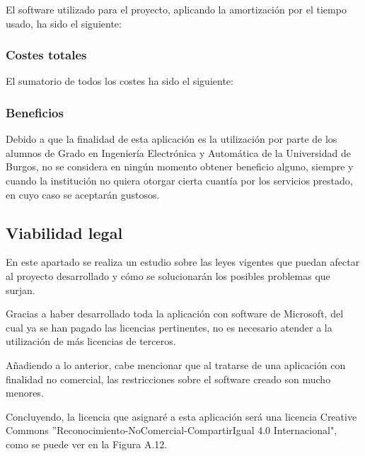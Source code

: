 El software utilizado para el proyecto, aplicando la amortización por el tiempo usado, ha sido el siguiente:


\subsubsection{Costes totales}

El sumatorio de todos los costes ha sido el siguiente:


\subsubsection{Beneficios}

Debido a que la finalidad de esta aplicación es la utilización por parte de los alumnos de Grado en Ingeniería Electrónica y Automática de la Universidad de Burgos, no se considera en ningún momento obtener beneficio alguno, siempre y cuando la institución no quiera otorgar cierta cuantía por los servicios prestado, en cuyo caso se aceptarán gustosos.

\subsection{Viabilidad legal}

En este apartado se realiza un estudio sobre las leyes vigentes que puedan afectar al proyecto desarrollado y cómo se solucionarán los posibles problemas que surjan.

Gracias a haber desarrollado toda la aplicación con software de Microsoft, del cual ya se han pagado las licencias pertinentes, no es necesario atender a la utilización de más licencias de terceros.

Añadiendo a lo anterior, cabe mencionar que al tratarse de una aplicación con finalidad no comercial, las restricciones sobre el software creado son mucho menores.

Concluyendo, la licencia que asignaré a esta aplicación será una licencia Creative Commons ''Reconocimiento-NoComercial-CompartirIgual 4.0 Internacional", como se puede ver en la Figura A.12.


